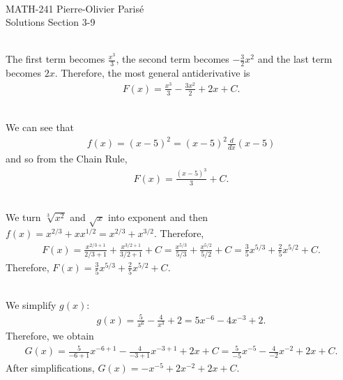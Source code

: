 


	\noindent \hrulefill \\
	MATH-241 \hfill Pierre-Olivier Paris{\'e}\\
	Solutions Section 3-9 \hfill \semester \\\vspace*{-1cm}
	
	\noindent\hrulefill
	
	\spc
	
	\\
	The first term becomes $\tfrac{x^3}{3}$, the second term becomes $-\tfrac{3}{2} x^2$ and the last term becomes $2x$. Therefore, the most general antiderivative is
		\begin{align*}
		F(x) = \frac{x^3}{3} - \frac{3x^2}{2} + 2x + C .
		\end{align*}					

	\spc
	
	\\
	We can see that
		\begin{align*}
		f(x) = (x - 5)^2 = (x - 5)^2 \frac{d}{dx} (x - 5)
		\end{align*}
	and so from the Chain Rule, 
		\begin{align*}
		F(x) = \frac{(x - 5)^3}{3} + C .
		\end{align*}
		
	\spc
	
	\\
	We turn $\sqrt[3]{x^2}$ and $\sqrt{x}$ into exponent and then $f(x) = x^{2/3} + x x^{1/2} = x^{2/3} + x^{3/2}$. Therefore,
		\begin{align*}
		F(x) = \frac{x^{2/3 + 1}}{2/3 + 1} + \frac{x^{3/2 + 1}}{3/2 + 1} + C  = \frac{x^{5/3}}{5/3} + \frac{x^{5/2}}{5/2} + C = \frac{3}{5} x^{5/3} + \frac{2}{5} x^{5/2} + C .
		\end{align*}
	Therefore, $F(x) = \frac{3}{5} x^{5/3} + \frac{2}{5} x^{5/2} + C$.
	
	\spc
	
	\\
	We simplify $g(x)$:
		\begin{align*}
		g(x) = \frac{5}{x^6} - \frac{4}{x^3} + 2 = 5x^{-6} - 4x^{-3} + 2 .
		\end{align*}
	Therefore, we obtain
		\begin{align*}
		G(x) = \frac{5}{-6 + 1} x^{-6 + 1} - \frac{4}{-3 + 1} x^{-3 + 1} + 2x + C = \frac{5}{-5} x^{-5} - \frac{4}{-2} x^{-2} + 2x +  C .
		\end{align*}
	After simplifications, $G(x) = -x^{-5} + 2x^{-2} + 2x + C$.
	
